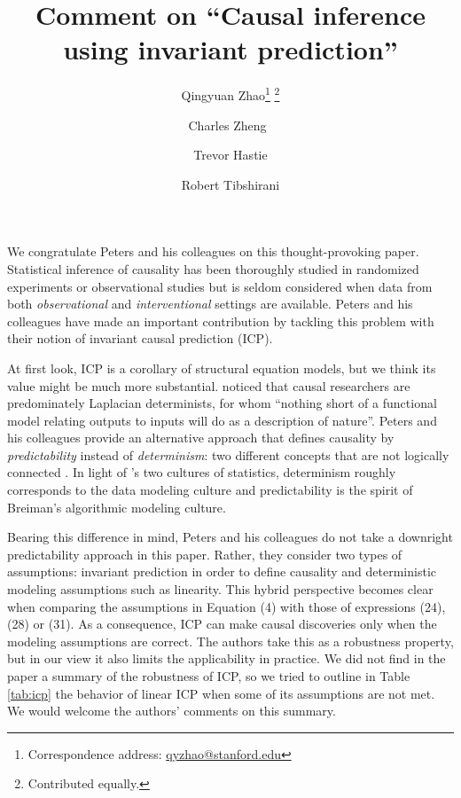 \documentclass{article}
\begin{document}
\title{Comment on ``Causal inference using invariant prediction''}


\author{Qingyuan Zhao\thanks{Correspondence address:
    \href{mailto:qyzhao@stanford.edu}{qyzhao@stanford.edu}}
  \footnote{Contributed equally.} }

\newcommand\CoAuthorMark{}
\author{Charles Zheng\protect\CoAuthorMark~}

\author{Trevor Hastie}

\author{Robert Tibshirani}


\date{}
\maketitle

We congratulate Peters and his colleagues on this thought-provoking
paper. Statistical inference of causality has been thoroughly studied
in randomized experiments or observational studies but is seldom
considered when data from both \emph{observational}
and \emph{interventional} settings are available. Peters and his colleagues
have made an important contribution by tackling this problem with
their notion of invariant causal prediction (ICP).

At first look, ICP is a corollary of structural
equation models, but we think its value might be much more
substantial. \citet{dawid2000causal} noticed that causal researchers
are predominately Laplacian determinists, for whom 
``nothing short of a functional model relating outputs to inputs will do
as a description of nature''. Peters and his colleagues provide an alternative
approach that defines causality by \emph{predictability} instead
of \emph{determinism}: two different concepts that are not logically
connected \citep{hoefer2016causal}. In light of
\citet{breiman2001statistical}'s two cultures of statistics,
determinism roughly corresponds to the data modeling culture and
predictability is the spirit of Breiman's algorithmic modeling
culture.

Bearing this difference in mind, Peters and his colleagues do not take a
downright predictability approach in this paper. Rather, they consider
two types of assumptions: invariant prediction in order to define
causality and deterministic modeling assumptions such as
linearity. This hybrid perspective becomes clear when comparing the
assumptions in Equation (4) with those of expressions (24), (28) or (31). As a consequence,
ICP can make causal discoveries only when the modeling
assumptions are correct. %
The authors take this as a
robustness property, but in our view it also limits the applicability in
practice. We did not find in the paper a summary of the robustness of
ICP, so we tried to outline in Table \ref{tab:icp} the behavior of
linear ICP when some of its assumptions are not met. We would welcome
the authors' comments on this summary.
\end{document}
